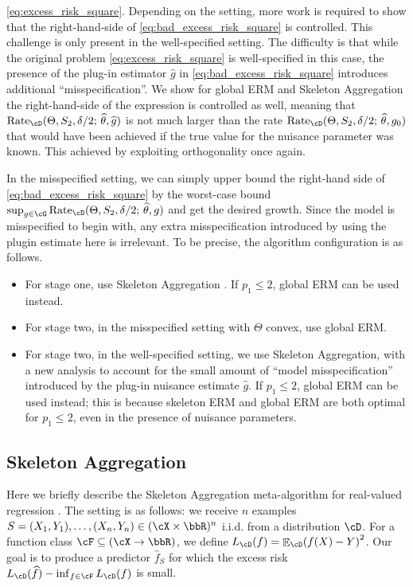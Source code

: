 \documentclass[11pt]{article} %
\newcommand{\pref}[1]{\cref{#1}}
\theoremstyle{theorem}  %
\theoremstyle{plain}
\DeclarePairedDelimiter{\prn}{(}{)}
\DeclareMathOperator{\En}{\mathbb{E}}
\newcommand{\wh}[1]{\widehat{#1}}
\newcommand{\midsem}{;\,}
\newcommand{\estone}{\wh{g}}
\newcommand{\esttwo}{\wh{\theta}}
\newcommand{\pone}{p_1}
\newcommand{\nuisance}{\cG}
\newcommand{\target}{\Theta}
\newcommand{\Rate}{\mathrm{Rate}_{\cD}}
\newcommand{\gtone}{g_0}
\newcommand{\sampletwo}{S_2}
\begin{document}
\pref{eq:excess_risk_square}. Depending on the setting, more work is
required to show that the right-hand-side of
\pref{eq:bad_excess_risk_square} is controlled. This challenge is only
present in the well-specified setting. The difficulty is that while
the original problem \pref{eq:excess_risk_square} is well-specified in
this case, the presence of the plug-in estimator $\estone$ in
\pref{eq:bad_excess_risk_square} introduces additional
``misspecification''. We show for global ERM and Skeleton Aggregation
the right-hand-side of the expression is controlled as well, meaning
that $\Rate(\target,\sampletwo,\delta/2\midsem{}\esttwo,\estone)$ is
not much larger than the rate
$\Rate(\target,\sampletwo,\delta/2\midsem{}\esttwo,\gtone)$ that would
have been achieved if the true value for the nuisance parameter was
known. This achieved by exploiting orthogonality once again.

In the misspecified setting, we can simply upper bound the right-hand
side of \pref{eq:bad_excess_risk_square} by the worst-case bound
$\sup_{g\in\nuisance}\Rate(\target,\sampletwo,\delta/2\midsem{}\esttwo,
g)$ and get the desired growth. Since the model is misspecified to begin with, any extra misspecification introduced by using the plugin estimate here is irrelevant.
To be precise, the algorithm configuration is as follows.
\begin{itemize}
\item For stage one, use Skeleton Aggregation \citep{yang1999information,rakhlin2017empirical}. If $\pone\leq{}2$, global ERM can be used instead.
\item For stage two, in the misspecified setting with $\target$ convex, use global ERM.
\item For stage two, in the well-specified setting, we use Skeleton Aggregation, with a new analysis to account for the small amount of ``model misspecification'' introduced by the plug-in nuisance estimate $\estone$. If $\pone\leq{}2$, global ERM can be used instead; this is because skeleton ERM and global ERM are both optimal for $\pone\leq{}2$, even in the presence of nuisance parameters. 
\end{itemize}

\subsection{Skeleton Aggregation}
\label{sec:skeleton}
Here we briefly describe the Skeleton Aggregation meta-algorithm for real-valued regression \citep{yang1999information,rakhlin2017empirical}. The setting is as follows: we receive $n$ examples $S=(X_1,Y_1),\ldots,(X_n,Y_n)\in(\cX\times{}\bbR)^{n}$  i.i.d. from a distribution $\cD$. For a function class $\cF\subseteq{}(\cX\to\bbR)$, we define $L_{\cD}(f) = \En_{\cD}\prn*{f(X)-Y}^{2}$. Our goal is to produce a predictor $\wh{f}_S$ for which the excess risk $L_{\cD}(\wh{f}) - \inf_{f\in\cF}L_{\cD}(f)$
is small.
\end{document}
